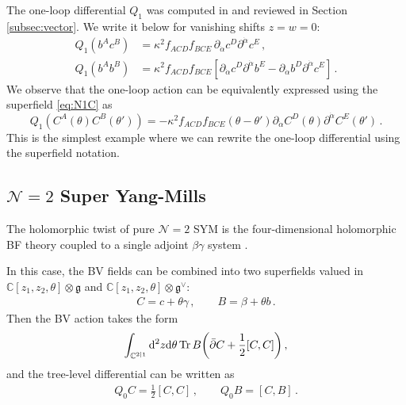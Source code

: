 \documentclass[11pt]{article}
\begin{document}
The one-loop differential $Q_1$ was computed in \cite{Budzik:2023xbr} and reviewed in Section \ref{subsec:vector}. We write it below for vanishing shifts $z=w=0$:
\begin{align}
     Q_1 (b^A c^B ) 
        &=  \kappa^2 f_{ACD}f_{BCE} \, \partial_{\dot\alpha} c^D\partial^{\dot\alpha} c^E \,, \\
     Q_1(b^A b^B) 
        &= \kappa^2 f_{ACD}f_{BCE} \left[ \partial_{\dot\alpha} c^D \partial^{\dot\alpha} b^E -\partial_{\dot\alpha} b^D\partial^{\dot\alpha} c^E  \right]\,.
\end{align}
We observe that the one-loop action can be equivalently expressed using the superfield \eqref{eq:N1C} as
\begin{equation}
    Q_1( C^A(\theta) C^B(\theta') ) = - \kappa^2 f_{ACD}f_{BCE} (\theta-\theta') \partial_{\dot\alpha} C^D(\theta) \partial^{\dot\alpha} C^E(\theta') \, . \label{eq:Q1N1}
\end{equation}
This is the simplest example where we can rewrite the one-loop differential using the superfield notation.

\subsection{\texorpdfstring{$\mathcal{N}=2$}{N=2} Super Yang-Mills}
\label{sec:N2}

The holomorphic twist of pure $\mathcal{N}=2$ SYM is the four-dimensional holomorphic BF theory coupled to a single adjoint $\beta\gamma$ system \cite{Costello:2011np, Elliott:2020ecf}.

In this case, the BV fields can be combined into two superfields valued in $\mathbb{C}[z_1,z_2,\theta]\otimes \mathfrak{g}$ and $\mathbb{C}[z_1,z_2,\theta]\otimes \mathfrak{g}^\vee$:
\begin{align}
    C= c+ \theta\gamma \, , \qquad 
    B  = \beta+\theta b \, . \label{eq:N2BC}
\end{align}
Then the BV action takes the form
\begin{align}
    \int_{\mathbb{C}^{2|1}} \dd^2 z \dd\theta \Tr B \qty( \bar\partial C + \frac{1}{2} [C,C] ) \, , 
\end{align}
and the tree-level differential can be written as
\begin{align}
    Q_0 C = \frac{1}{2}[C,C] \, , \qquad Q_0 B=[C,B] \, .
\end{align}
\end{document}

